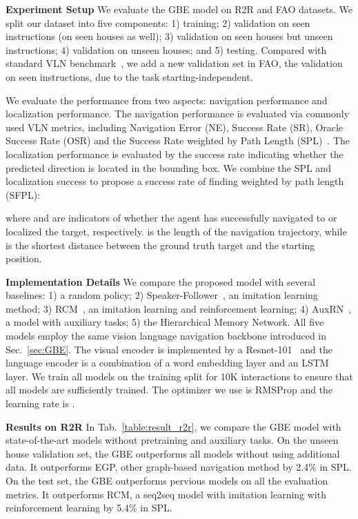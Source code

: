 \documentclass[final]{cvpr}
\begin{document}
\noindent\textbf{Experiment Setup}
We evaluate the GBE model on R2R and FAO datasets. 
We split our dataset into five components: 1) training; 2) validation on seen instructions (on seen houses as well); 3) validation on seen houses but unseen instructions; 4) validation on unseen houses; and 5) testing. Compared with standard VLN benchmark~\cite{anderson2018vision}, we add a new validation set in FAO, the validation on seen instructions, due to the task starting-independent. 

We evaluate the performance from two aspects: navigation performance and localization performance. The navigation performance is evaluated via commonly used VLN metrics, including Navigation Error (NE), Success Rate (SR), Oracle Success Rate (OSR) and the Success Rate weighted by Path Length (SPL)~\cite{anderson2018on}. 
The localization performance is evaluated by the success rate indicating whether the predicted direction is located in the bounding box. We combine the SPL and localization success to propose a success rate of finding weighted by path length (SFPL): 

where  and  are indicators of whether the agent has successfully navigated to or localized the target, respectively.  is the length of the navigation trajectory, while  is the shortest distance between the ground truth target and the starting position. 

\noindent\textbf{Implementation Details}
We compare the proposed model with several baselines: 1) a random policy; 
2) Speaker-Follower~\cite{fried2018speaker}, an imitation learning method; 
3) RCM~\cite{wang2018reinforced}, an imitation learning and reinforcement learning; 
4) AuxRN~\cite{zhu2019vision}, a model with auxiliary tasks; 
5) the Hierarchical Memory Network. 
All five models employ the same vision language navigation backbone introduced in Sec.~\ref{sec:GBE}. 
The visual encoder  is implemented by a Resnet-101~\cite{he2016deep} and the language encoder  is a combination of a word embedding layer and an LSTM~\cite{hochreiter1997long} layer. 
We train all models on the training split for 10K interactions to ensure that all models are sufficiently trained. The optimizer we use is RMSProp and the learning rate is . 

\noindent\textbf{Results on R2R}
In Tab.~\ref{table:result_r2r}, we compare the GBE model with state-of-the-art models without pretraining and auxiliary tasks. 
On the unseen house validation set, the GBE outperforms all models without using additional data. 
It outperforms EGP, other graph-based navigation method by 2.4\% in SPL. 
On the test set, the GBE outperforms pervious models on all the evaluation metrics. 
It outperforms RCM, a seq2seq model with imitation learning with reinforcement learning by 5.4\% in SPL. 
\end{document}
